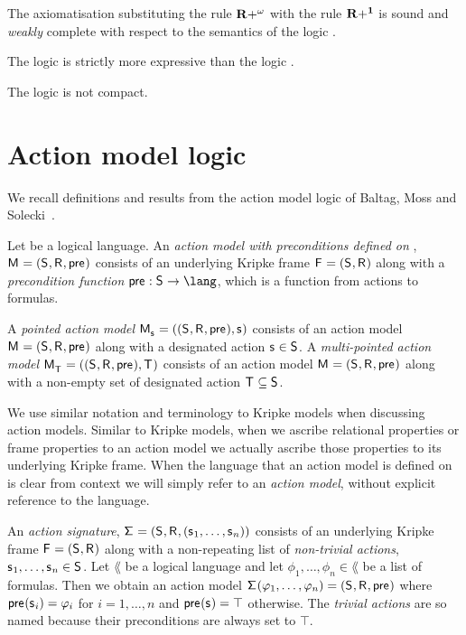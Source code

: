 \begin{proposition}
The axiomatisation \axiomApalS{} substituting the rule ${\bf R+^\omega}$ with the rule ${\bf R+^1}$ is sound and {\em weakly} complete with respect to the semantics of the logic \logicApalS{}.
\end{proposition}

\begin{proposition}
The logic \logicApalS{} is strictly more expressive than the logic \logicPalS{}.
\end{proposition}

\begin{proposition}
The logic \logicApalS{} is not compact.
\end{proposition}

\section{Action model logic}\label{aml}

We recall definitions and results from the action model logic of Baltag, Moss and Solecki~\cite{baltag:1998,baltag:2004}.

\begin{definition}
Let \lang{} be a logical language.
An {\em action model with preconditions defined on \lang{}}, $\aModelAndTuple$ consists of an underlying Kripke frame $\aFrameAndTuple$ along with a {\em precondition function} $\aPrecondition : \aStates \to \lang$, which is a function from actions to formulas.

A {\em pointed action model} $\aPModelAndTuple{\aStateS}$ consists of an action model $\aModelAndTuple$ along with a designated action $\aStateS \in \aStates$.
A {\em multi-pointed action model} $\aPModelAndTuple{\aStatesT}$ consists of an action model $\aModelAndTuple$ along with a non-empty set of designated action $\aStatesT \subseteq \aStates$.
\end{definition}

We use similar notation and terminology to Kripke models when discussing action models.
Similar to Kripke models, when we ascribe relational properties or frame properties to an action model we actually ascribe those properties to its underlying Kripke frame.
When the language that an action model is defined on is clear from context we will simply refer to an {\em action model}, without explicit reference to the language.

\begin{definition}
An {\em action signature}, $\aSignatureAndTuple$ consists of an underlying Kripke frame $\aFrameAndTuple$ along with a non-repeating list of {\em non-trivial actions}, $\aStateS_1, \dots, \aStateS_n \in \aStates$.
Let $\lang$ be a logical language and let $\phi_1, \dots, \phi_n \in \lang$ be a list of formulas.
Then we obtain an action model $\aSignature(\phi_1, \dots, \phi_n) = \aModelTuple$ where $\aPrecondition(\aStateS_i) = \phi_i$ for $i = 1, \dots, n$ and $\aPrecondition(\aStateS) = \top$ otherwise.
The {\em trivial actions} are so named because their preconditions are always set to $\top$.
\end{definition}


